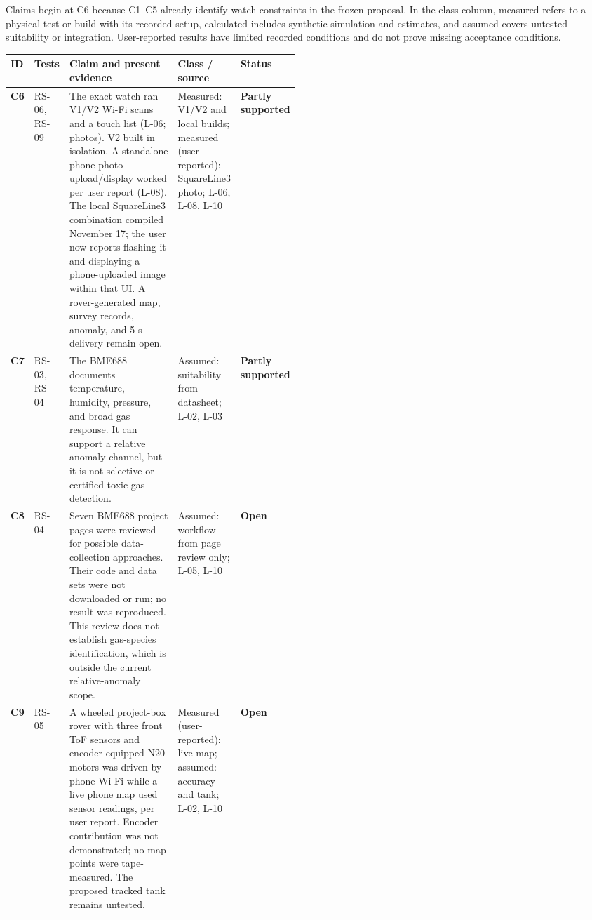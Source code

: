 \documentclass[conference,onecolumn,letterpaper]{IEEEtran}
\renewcommand{\arraystretch}{1.12}
\newcommand{\openstatus}{\textbf{Open}}
\newcommand{\partialstatus}{\textbf{Partly supported}}
\begin{document}
Claims begin at C6 because C1--C5 already identify watch constraints in the frozen proposal. In the class column, measured refers to a physical test or build with its recorded setup, calculated includes synthetic simulation and estimates, and assumed covers untested suitability or integration. User-reported results have limited recorded conditions and do not prove missing acceptance conditions.

\begingroup\footnotesize\renewcommand{\arraystretch}{1.04}
\noindent\begin{tabularx}{\linewidth}{>{\bfseries}p{0.055\linewidth}>{\raggedright\arraybackslash}p{0.12\linewidth}X>{\raggedright\arraybackslash}p{0.18\linewidth}>{\raggedright\arraybackslash}p{0.12\linewidth}}
\toprule
ID & Tests & Claim and present evidence & Class / source & Status \\
\midrule
C6 & RS-06, RS-09 & The exact watch ran V1/V2 Wi-Fi scans and a touch list (L-06; photos). V2 built in isolation. A standalone phone-photo upload/display worked per user report (L-08). The local SquareLine3 combination compiled November 17; the user now reports flashing it and displaying a phone-uploaded image within that UI. A rover-generated map, survey records, anomaly, and 5 s delivery remain open. & Measured: V1/V2 and local builds; measured (user-reported): SquareLine3 photo; L-06, L-08, L-10 \cite{waveshare} & \partialstatus \\
C7 & RS-03, RS-04 & The BME688 documents temperature, humidity, pressure, and broad gas response. It can support a relative anomaly channel, but it is not selective or certified toxic-gas detection. & Assumed: suitability from datasheet; L-02, L-03 \cite{bosch} & \partialstatus \\
C8 & RS-04 & Seven BME688 project pages were reviewed for possible data-collection approaches. Their code and data sets were not downloaded or run; no result was reproduced. This review does not establish gas-species identification, which is outside the current relative-anomaly scope. & Assumed: workflow from page review only; L-05, L-10 & \openstatus \\
C9 & RS-05 & A wheeled project-box rover with three front ToF sensors and encoder-equipped N20 motors was driven by phone Wi-Fi while a live phone map used sensor readings, per user report. Encoder contribution was not demonstrated; no map points were tape-measured. The proposed tracked tank remains untested. & Measured (user-reported): live map; assumed: accuracy and tank; L-02, L-10 & \openstatus \\

\end{tabularx}
\end{document}
